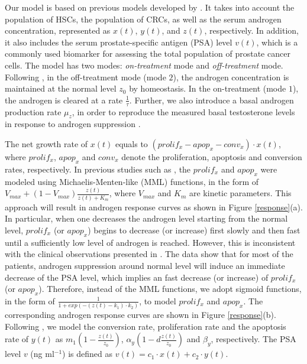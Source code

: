 

Our model is based on previous models developed by \cite{jackson04a,jackson04b,ideta08}. It takes into account the population of HSCs, the population of CRCs, as well as the serum androgen concentration, represented as $x(t)$, $y(t)$, and $z(t)$, respectively. In addition, it also includes the serum prostate-specific antigen (PSA) level $v(t)$, which is a commonly used biomarker for assessing the total population of prostate cancer cells. The model has two modes: \textit{on-treatment} mode and \textit{off-treatment} mode. Following \cite{ideta08}, in the off-treatment mode (mode $2$), the androgen concentration is maintained at the normal level $z_0$ by homeostasis. In the on-treatment (mode $1$), the androgen is cleared at a rate $\frac{1}{\tau}$. Further, we also introduce a basal androgen production rate $\mu_z$, in order to reproduce the measured basal testosterone levels in response to androgen suppression \cite{bruchovsky06, bruchovsky07}. 

The net growth rate of $x(t)$ equals to $(prolif_{x}-apop_{x}-conv_{x})\cdot x(t)$, where $prolif_x$, $apop_x$ and $conv_x$ denote the proliferation, apoptosis and conversion rates, respectively. In previous studies such as \cite{jackson04a,jackson04b,ideta08}, the $prolif_x$ and $apop_x$ were modeled using Michaelis-Menten-like (MML) functions, in the form of $V_{max}+(1-V_{max})\frac{z(t)}{z(t)+K_{m}}$, where $V_{max}$ and $K_m$ are kinetic parameters. This approach will result in androgen response curves as shown in Figure \ref{response}(a). In particular, when one decreases the androgen level starting from the normal level, $prolif_x$ (or $apop_x$) begins to decrease (or increase) first slowly and then fast until a sufficiently low level of androgen is reached. However, this is inconsistent with the clinical observations presented in \cite{bruchovsky06, bruchovsky07}. The data show that for most of the patients, androgen suppression around normal level will induce an immediate decrease of the PSA level, which implies an fast decrease (or increase) of $prolif_x$ (or $apop_x$). Therefore, instead of the MML functions, we adopt sigmoid functions, in the form of  $\frac{1}{1+exp(-(z(t)-k_1)\cdot k_2)}$, to model $prolif_x$ and $apop_x$. The corresponding androgen response curves are shown in Figure \ref{response}(b). Following \cite{ideta08}, we model the conversion rate, proliferation rate and the apoptosis rate of $y(t)$ as $m_1(1-\frac{z(t)}{z_0})$, $\alpha_y(1-d\frac{z(t)}{z_0})$ and $\beta_y$, respectively. The PSA level $v$ (ng ml$^{-1}$) is defined as $v(t)=c_1\cdot x(t)+c_2\cdot y(t)$. 

